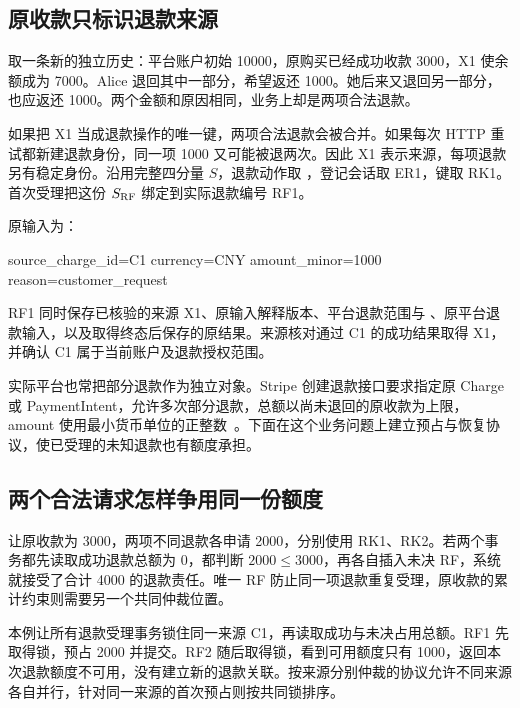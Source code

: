 \subsection*{原收款只标识退款来源}

取一条新的独立历史：平台账户初始 10000，原购买已经成功收款 3000，X1 使余额成为 7000。Alice 退回其中一部分，希望返还 1000。她后来又退回另一部分，也应返还 1000。两个金额和原因相同，业务上却是两项合法退款。

如果把 X1 当成退款操作的唯一键，两项合法退款会被合并。如果每次 HTTP 重试都新建退款身份，同一项 1000 又可能被退两次。因此 X1 表示来源，每项退款另有稳定身份。沿用完整四分量 $S$，退款动作取 ，登记会话取 ER1，键取 RK1。首次受理把这份 $S_{\rm RF}$ 绑定到实际退款编号 RF1。

原输入为：
\begin{BookCode}
source_charge_id=C1
currency=CNY
amount_minor=1000
reason=customer_request
\end{BookCode}
RF1 同时保存已核验的来源 X1、原输入解释版本、平台退款范围与 、原平台退款输入，以及取得终态后保存的原结果。来源核对通过 C1 的成功结果取得 X1，并确认 C1 属于当前账户及退款授权范围。


实际平台也常把部分退款作为独立对象。Stripe 创建退款接口要求指定原 Charge 或 PaymentIntent，允许多次部分退款，总额以尚未退回的原收款为上限，amount 使用最小货币单位的正整数~\cite{stripe-refunds-create}。下面在这个业务问题上建立预占与恢复协议，使已受理的未知退款也有额度承担。

\subsection*{两个合法请求怎样争用同一份额度}

让原收款为 3000，两项不同退款各申请 2000，分别使用 RK1、RK2。若两个事务都先读取成功退款总额为 0，都判断 $2000\le3000$，再各自插入未决 RF，系统就接受了合计 4000 的退款责任。唯一 RF 防止同一项退款重复受理，原收款的累计约束则需要另一个共同仲裁位置。

本例让所有退款受理事务锁住同一来源 C1，再读取成功与未决占用总额。RF1 先取得锁，预占 2000 并提交。RF2 随后取得锁，看到可用额度只有 1000，返回本次退款额度不可用，没有建立新的退款关联。按来源分别仲裁的协议允许不同来源各自并行，针对同一来源的首次预占则按共同锁排序。


